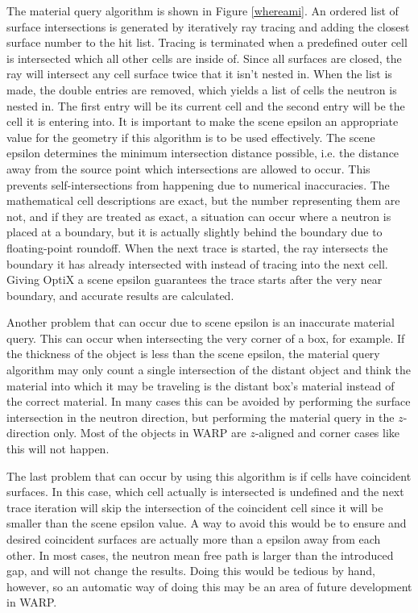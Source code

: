 The material query algorithm is shown in Figure \ref{whereami}.  An ordered list of surface intersections is generated by iteratively ray tracing and adding the closest surface number to the hit list.  Tracing is terminated when a predefined outer cell is intersected which all other cells are inside of.  Since all surfaces are closed, the ray will intersect any cell surface twice that it isn't nested in.  When the list is made, the double entries are removed, which yields a list of cells the neutron is nested in.  The first entry will be its current cell and the second entry will be the cell it is entering into.  It is important to make the scene epsilon an appropriate value for the geometry if this algorithm is to be used effectively.  The scene epsilon determines the minimum intersection distance possible, i.e. the distance away from the source point which intersections are allowed to occur.  This prevents self-intersections from happening due to numerical inaccuracies.  The mathematical cell descriptions are exact, but the number representing them are not, and if they are treated as exact, a situation can occur where a neutron is placed at a boundary, but it is actually slightly behind the boundary due to floating-point roundoff.  When the next trace is started, the ray intersects the boundary it has already intersected with instead of tracing into the next cell.  Giving OptiX a scene epsilon guarantees the trace starts after the very near boundary, and accurate results are calculated.  

Another problem that can occur due to scene epsilon is an inaccurate material query.  This can occur when intersecting the very corner of a box, for example. If the thickness of the object is less than the scene epsilon, the material query algorithm may only count a single intersection of the distant object and think the material into which it may be traveling is the distant box's material instead of the correct material.  In many cases this can be avoided by performing the surface intersection in the neutron direction, but performing the material query in the $z$-direction only.  Most of the objects in WARP are $z$-aligned and corner cases like this will not happen.

The last problem that can occur by using this algorithm is if cells have coincident surfaces.  In this case, which cell actually is intersected is undefined and the next trace iteration will skip the intersection of the coincident cell since it will be smaller than the scene epsilon value.  A way to avoid this would be to ensure and desired coincident surfaces are actually more than a epsilon away from each other.  In most cases, the neutron mean free path is larger than the introduced gap, and will not change the results.  Doing this would be tedious by hand, however, so an automatic way of doing this may be an area of future development in WARP.

